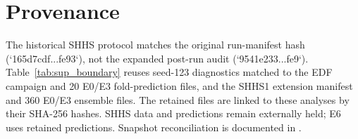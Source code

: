 \documentclass[10pt,a4paper]{article}
\begin{document}
\section*{Provenance}

The historical SHHS protocol matches the original run-manifest hash (`165d7cdf...fe93`), not the
expanded post-run audit (`9541e233...fe9`). Table~\ref{tab:sup_boundary} reuses seed-123 diagnostics
matched to the EDF campaign and 20 E0/E3 fold-prediction files, and the SHHS1 extension manifest and
360 E0/E3 ensemble files. The retained files are linked to these analyses by their SHA-256 hashes.
SHHS data and predictions remain externally held; E6 uses retained predictions.
Snapshot reconciliation is documented in .
\end{document}
